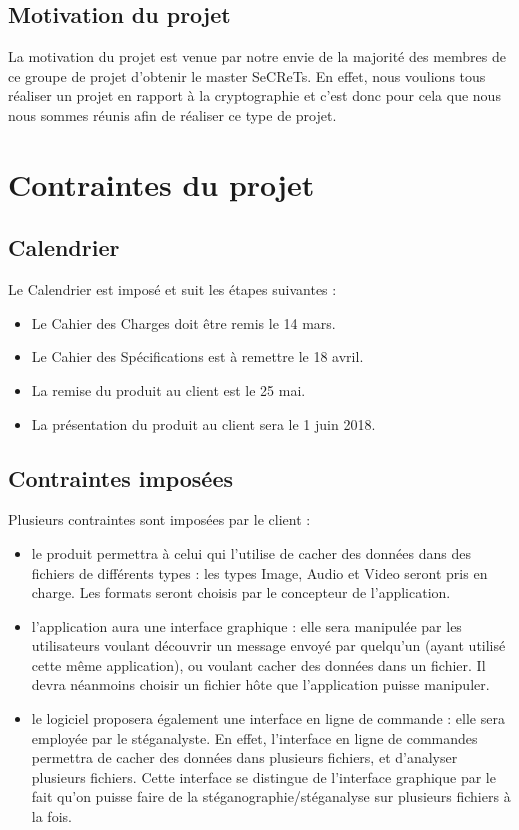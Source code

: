 \documentclass[11pt]{article}
\begin{document}
\subsection{Motivation du projet}

La motivation du projet est venue par notre envie de la majorité des membres de ce groupe de projet d'obtenir le master SeCReTs. 
En effet, nous voulions tous réaliser un projet en rapport à la cryptographie et c'est donc pour cela que nous nous sommes réunis afin de réaliser ce type de projet. 

\section{Contraintes du projet}

\subsection{Calendrier}

Le Calendrier est imposé et suit les étapes suivantes : 

\begin {itemize}
\item Le Cahier des Charges doit être remis le 14 mars. 
\item Le Cahier des Spécifications est à remettre le 18 avril. 
\item La remise du produit au client est le 25 mai. 
\item La présentation du produit au client sera le 1 juin 2018.  
\end{itemize}


\subsection{Contraintes imposées}
Plusieurs contraintes sont imposées par le client : 
\begin{itemize}
\item le produit permettra à celui qui l'utilise de cacher des données dans des fichiers de différents types : les types Image, Audio et Video seront pris en charge. Les formats seront choisis par le concepteur de l'application. 
\item l'application aura une interface graphique : elle sera manipulée par les utilisateurs voulant découvrir un message envoyé par quelqu'un (ayant utilisé cette même application), ou voulant cacher des données dans un fichier. 
Il devra néanmoins choisir un fichier hôte que l'application puisse manipuler. 
\item le logiciel proposera également une interface en ligne de commande : elle sera employée par le stéganalyste. En effet, l'interface en ligne de commandes permettra de cacher des données dans plusieurs fichiers, et d'analyser plusieurs fichiers. 
Cette interface se distingue de l'interface graphique par le fait qu'on puisse faire de la stéganographie/stéganalyse sur plusieurs fichiers à la fois. 
\end{itemize}
\end{document}
